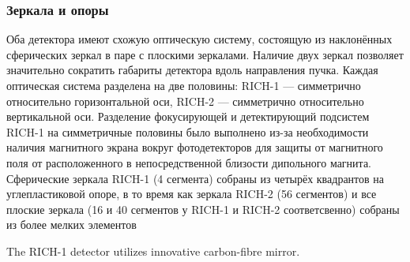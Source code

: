 
\subsubsection{Зеркала и опоры}

Оба детектора имеют схожую оптическую систему, состоящую из наклонённых сферических зеркал в паре с плоскими зеркалами. Наличие двух зеркал позволяет значительно сократить габариты детектора вдоль направления пучка. Каждая оптическая система разделена на две половины: \mbox{RICH-1} --- симметрично относительно горизонтальной оси, \mbox{RICH-2} --- симметрично относительно вертикальной оси. Разделение фокусирующей и детектирующий подсистем \mbox{RICH-1} на симметричные половины было выполнено из-за необходимости наличия магнитного экрана вокруг фотодетекторов для защиты от магнитного поля от расположенного в непосредственной близости дипольного магнита.
Сферические зеркала \mbox{RICH-1} (4 сегмента) собраны из четырёх квадрантов на углепластиковой опоре, в то время как зеркала \mbox{RICH-2} (56 сегментов) и все плоские зеркала (16 и 40 сегментов у \mbox{RICH-1} и \mbox{RICH-2} соответсвенно) собраны из более мелких элементов \todo

The \mbox{RICH-1} detector utilizes innovative carbon-fibre mirror. \todo


